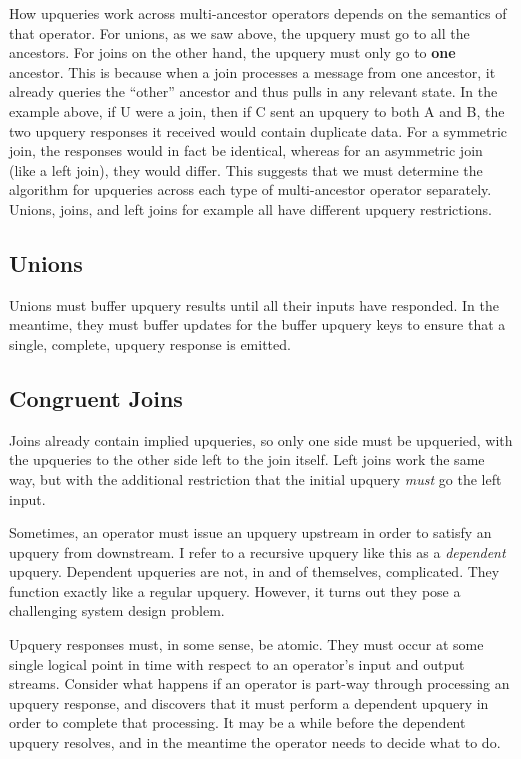 How upqueries work across multi-ancestor operators depends on the
semantics of that operator. For unions, as we saw above, the upquery
must go to all the ancestors. For joins on the other hand, the upquery
must only go to \textbf{one} ancestor. This is because when a join processes
a message from one ancestor, it already queries the ``other'' ancestor and
thus pulls in any relevant state. In the example above, if U were a
join, then if C sent an upquery to both A and B, the two upquery
responses it received would contain duplicate data. For a symmetric
join, the responses would in fact be identical, whereas for an
asymmetric join (like a left join), they would differ. This suggests
that we must determine the algorithm for upqueries across each type of
multi-ancestor operator separately. Unions, joins, and left joins for
example all have different upquery restrictions.

\subsection{Unions}

Unions must buffer upquery results until all their inputs have responded. In the
meantime, they must buffer updates for the buffer upquery keys to ensure that a
single, complete, upquery response is emitted.

\subsection{Congruent Joins}

Joins already contain implied upqueries, so only one side must be upqueried,
with the upqueries to the other side left to the join itself. Left joins work
the same way, but with the additional restriction that the initial upquery
\emph{must} go the left input.

Sometimes, an operator must issue an upquery upstream in order to
satisfy an upquery from downstream. I refer to a recursive upquery like
this as a \emph{dependent} upquery. Dependent upqueries are not, in and of
themselves, complicated. They function exactly like a regular upquery.
However, it turns out they pose a challenging system design problem.

Upquery responses must, in some sense, be atomic. They must occur at
some single logical point in time with respect to an operator's input
and output streams. Consider what happens if an operator is part-way
through processing an upquery response, and discovers that it must
perform a dependent upquery in order to complete that processing. It may
be a while before the dependent upquery resolves, and in the meantime
the operator needs to decide what to do.

